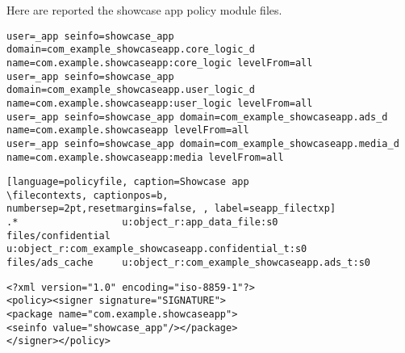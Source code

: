 Here are reported the showcase app policy module files.
\vspace{0.6em}
\begin{lstlisting}[language=policyfile, caption=Showcase app
\seappcontexts, captionpos=b, numbersep=2pt,
resetmargins=false, label=seapp_seappctxp]
user=_app seinfo=showcase_app domain=com_example_showcaseapp.core_logic_d name=com.example.showcaseapp:core_logic levelFrom=all
user=_app seinfo=showcase_app domain=com_example_showcaseapp.user_logic_d name=com.example.showcaseapp:user_logic levelFrom=all
user=_app seinfo=showcase_app domain=com_example_showcaseapp.ads_d name=com.example.showcaseapp levelFrom=all
user=_app seinfo=showcase_app domain=com_example_showcaseapp.media_d name=com.example.showcaseapp:media levelFrom=all
\end{lstlisting}
\vspace{0.6em}
\begin{lstlisting}[language=policyfile, caption=Showcase app
\filecontexts, captionpos=b,
numbersep=2pt,resetmargins=false, , label=seapp_filectxp]
.*                  u:object_r:app_data_file:s0
files/confidential  u:object_r:com_example_showcaseapp.confidential_t:s0
files/ads_cache     u:object_r:com_example_showcaseapp.ads_t:s0
\end{lstlisting}
\vspace{0.6em}
\begin{lstlisting}[language=policyfile, caption=Showcase app
\macpermissions, captionpos=b, numbersep=2pt, resetmargins=false, label=seapp_macctxp]
<?xml version="1.0" encoding="iso-8859-1"?>
<policy><signer signature="SIGNATURE">
<package name="com.example.showcaseapp">
<seinfo value="showcase_app"/></package>
</signer></policy>
\end{lstlisting}
\vspace{0.6em}
